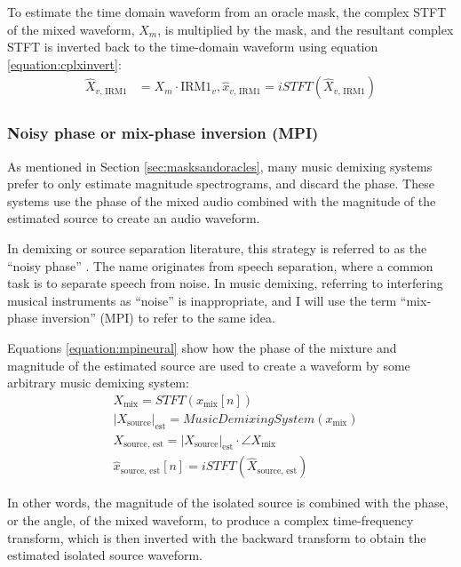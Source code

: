 \documentclass[report.tex]{subfiles}
\begin{document}
To estimate the time domain waveform from an oracle mask, the complex STFT of the mixed waveform, $X_{m}$, is multiplied by the mask, and the resultant complex STFT is inverted back to the time-domain waveform using equation \eqref{equation:cplxinvert}:
\begin{align}\tag{21}\label{equation:cplxinvert}
	\nonumber \hat{X}_{v\text{, IRM1}} &= X_{m} \cdot \text{IRM1}_{v}, \hat{x}_{v\text{, IRM1}} = \mathit{iSTFT}(\hat{X}_{v\text{, IRM1}})
\end{align}

\subsubsection{Noisy phase or mix-phase inversion (MPI)}
\label{sec:noisyphaseoracle}

As mentioned in Section \ref{sec:masksandoracles}, many music demixing systems prefer to only estimate magnitude spectrograms, and discard the phase. These systems use the phase of the mixed audio combined with the magnitude of the estimated source to create an audio waveform.

In demixing or source separation literature, this strategy is referred to as the ``noisy phase'' \parencite{noisyphase1, noisyphase2}. The name originates from speech separation, where a common task is to separate speech from noise. In music demixing, referring to interfering musical instruments as ``noise'' is inappropriate, and I will use the term ``mix-phase inversion'' (MPI) to refer to the same idea.

Equations \eqref{equation:mpineural} show how the phase of the mixture and magnitude of the estimated source are used to create a waveform by some arbitrary music demixing system:
\begin{align}\tag{29}\label{equation:mpineural}
	\nonumber & X_{\text{mix}} = \mathit{STFT}(x_{\text{mix}}[n])\\
	\nonumber & {|X_{\text{source}}|}_{\text{est}} = \mathit{MusicDemixingSystem}(x_{\text{mix}})\\
	\nonumber & X_{\text{source, est}} = {|X_{\text{source}}|}_{\text{est}} \cdot \angle{X_{\text{mix}}}\\
	\nonumber & \hat{x}_{\text{source, est}}[n] = \mathit{iSTFT}(\hat{X}_{\text{source, est}})
\end{align}

In other words, the magnitude of the isolated source is combined with the phase, or the angle, of the mixed waveform, to produce a complex time-frequency transform, which is then inverted with the backward transform to obtain the estimated isolated source waveform. 
\end{document}
